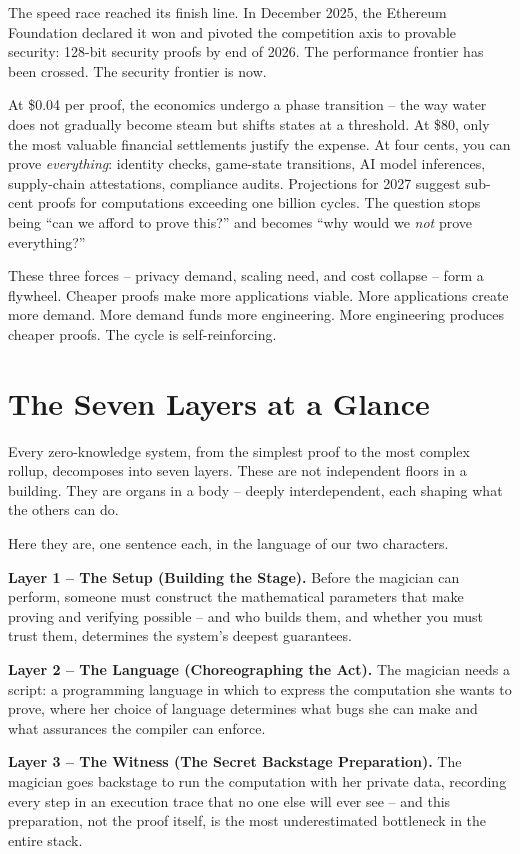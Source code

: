 \documentclass[
  11pt,
  openany]{report}
\renewcommand{\textbf}[1]{{\bfseries\color{MidnightBold}#1}}
\begin{document}
The speed race reached its finish line. In December 2025, the Ethereum
Foundation declared it won and pivoted the competition axis to provable
security: 128-bit security proofs by end of 2026. The performance frontier has
been crossed. The security frontier is now.

At \$0.04 per proof, the economics undergo a phase transition -- the way water
does not gradually become steam but shifts states at a threshold. At \$80, only
the most valuable financial settlements justify the expense. At four cents, you
can prove \emph{everything}: identity checks, game-state transitions, AI model
inferences, supply-chain attestations, compliance audits. Projections for 2027
suggest sub-cent proofs for computations exceeding one billion cycles. The
question stops being ``can we afford to prove this?'' and becomes ``why would we
\emph{not} prove everything?''

These three forces -- privacy demand, scaling need, and cost collapse -- form a
flywheel. Cheaper proofs make more applications viable. More applications create
more demand. More demand funds more engineering. More engineering produces
cheaper proofs. The cycle is self-reinforcing.

\section{The Seven Layers at a Glance}\label{the-seven-layers-at-a-glance}

Every zero-knowledge system, from the simplest proof to the most complex rollup,
decomposes into seven layers. These are not independent floors in a building.
They are organs in a body -- deeply interdependent, each shaping what the others
can do.

Here they are, one sentence each, in the language of our two characters.

\textbf{Layer 1 -- The Setup (Building the Stage).} Before the magician can
perform, someone must construct the mathematical parameters that make proving
and verifying possible -- and who builds them, and whether you must trust them,
determines the system's deepest guarantees.

\textbf{Layer 2 -- The Language (Choreographing the Act).} The magician needs a
script: a programming language in which to express the computation she wants to
prove, where her choice of language determines what bugs she can make and what
assurances the compiler can enforce.

\textbf{Layer 3 -- The Witness (The Secret Backstage Preparation).} The magician
goes backstage to run the computation with her private data, recording every
step in an execution trace that no one else will ever see -- and this
preparation, not the proof itself, is the most underestimated bottleneck in the
entire stack.
\end{document}
